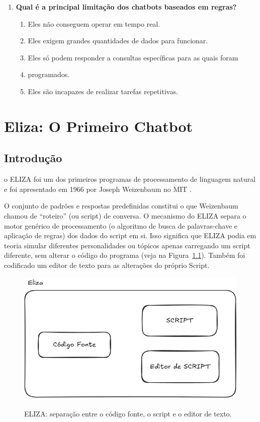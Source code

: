 \documentclass[14pt,a4paper,oneside]{book}
\begin{document}
\begin{enumerate}
\item \textbf{Qual é a principal limitação dos chatbots baseados em regras?}
\begin{enumerate}[label=\alph*)]
\item Eles não conseguem operar em tempo real. 
\item Eles exigem grandes quantidades de dados para funcionar. 
\item Eles só podem responder a consultas específicas para as quais foram \item programados. 
\item Eles são incapazes de realizar tarefas repetitivas. 
\end{enumerate}

\end{enumerate}


\chapter{Eliza: O Primeiro Chatbot}

\section{Introdução}

o ELIZA foi um dos primeiros programas de processamento de linguagem natural e foi apresentado em 1966 por Joseph Weizenbaum no MIT \cite{Weizenbaum1996}.

O conjunto de padrões e respostas predefinidas constitui o que Weizenbaum chamou de “roteiro” (ou script) de conversa. O mecanismo do ELIZA separa o motor genérico de processamento (o algoritmo de busca de palavras-chave e aplicação de regras) dos dados do script em si. Isso significa que ELIZA podia em teoria simular diferentes personalidades ou tópicos apenas carregando um script diferente, sem alterar o código do programa (veja na Figura~\ref{fig:elizaeditor}). Também foi codificado um editor de texto para as alterações do próprio Script.

\begin{figure}[!htbp]
	\centering	
	\caption{ELIZA: separação entre o código fonte, o script e o editor de texto.}
	\includegraphics[width=0.9\linewidth]{./fig/eliza.png}
	\label{fig:elizaeditor}
\end{figure}
\end{document}

